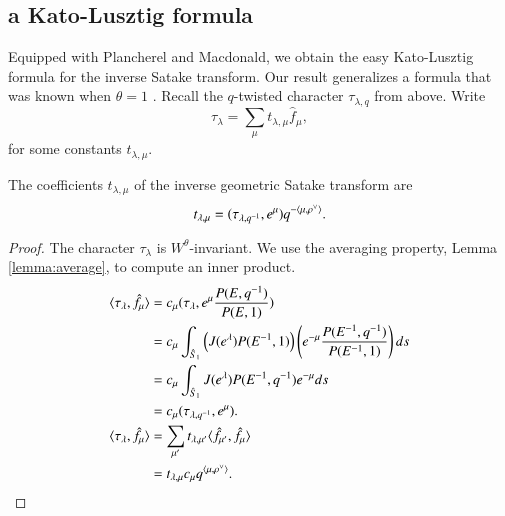 \subsection{a Kato-Lusztig formula}

Equipped with Plancherel and Macdonald, we obtain the easy Kato-Lusztig formula for the inverse Satake transform.
Our result generalizes a formula that was
 known when $\theta=1$ \cite{kato1982spherical} \cite{lusztig1983singularities}.
Recall the $q$-twisted character  $\tau_{\lambda,q}$ from above.
Write 
\[
\tau_\lambda = \sum_\mu t_{\lambda,\mu}  \hat f_\mu,
\]
for some constants $t_{\lambda,\mu}$.

\begin{theorem}
The coefficients $t_{\lambda,\mu}$ of the inverse geometric Satake transform are 
\[
t_{\lambda,\mu} =  (\tau_{\lambda,q^{-1}},e^\mu) q^{-\langle{\mu,\rho^\vee}\rangle}.
\]
\end{theorem}

\begin{proof}
The character $\tau_\lambda$ is $W^\theta$-invariant. 
We use the averaging property, Lemma \ref{lemma:average}, to compute an inner product.
\begin{align*}
\langle{\tau_\lambda,\hat f_\mu}\rangle
&=c_\mu(\tau_\lambda,e^\mu \frac{P(E,q^{-1})}{P(E,1)})\\
&=c_\mu\int_{\hat S_1} \left(J(e^\lambda) P(E^{-1},1)\right) \left( e^{-\mu}\frac{P(E^{-1},q^{-1})}{P(E^{-1},1)} \right) ds\\
&=
c_\mu\int_{\hat S_1} J(e^\lambda) P(E^{-1},q^{-1}) e^{-\mu} ds\\
&= c_\mu(\tau_{\lambda,q^{-1}},e^\mu).\\
\langle{\tau_\lambda,\hat f_\mu}\rangle
&=\sum_{\mu'} t_{\lambda,\mu'} \langle{\hat f_{\mu'},\hat f_\mu}\rangle \\
&= t_{\lambda,\mu} c_\mu q^{\langle{\mu,\rho^\vee}\rangle}.
\end{align*}
\end{proof}



